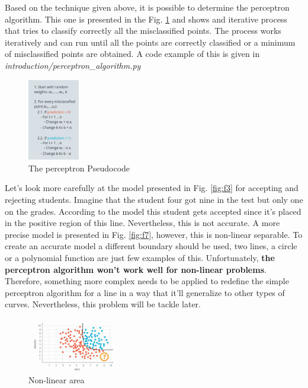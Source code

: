 \documentclass{article}
\begin{document}
Based on the technique given above, it is possible to determine the perceptron algorithm. This one is presented in the Fig. \ref{fig:f16} and shows and iterative process that tries to classify correctly all the misclassified points. The process works iteratively and can run until all the points are correctly classified or a minimum of misclassified points are obtained. A code example of this is given in \textit{introduction/perceptron\_algorithm.py}
  
\begin{figure}[ht]
    \centering
    \includegraphics[width=0.2\textwidth,height=0.2\textheight,keepaspectratio]{images/perceotron_algorithm.png}
    \captionsetup{justification=centering}
    \caption{The perceptron Pseudocode}
    \label{fig:f16}
\end{figure}
  
Let's look more carefully at the model presented in Fig. \ref{fig:f3} for accepting and rejecting students. Imagine that the student four got nine in the test but only one on the grades. According to the model this student gets accepted since it's placed in the positive region of this line. Nevertheless, this is not accurate. A more precise model is presented in Fig. \ref{fig:f7}, however, this is non-linear separable. To create an accurate model a different boundary should be used, two lines, a circle or a polynomial function are just few examples of this. Unfortunately, \textbf{the perceptron algorithm won't work well for non-linear problems}. Therefore, something more complex needs to be applied to redefine the simple perceptron algorithm for a line in a way that it'll generalize to other types of curves. Nevertheless, this problem will be tackle later.

\begin{figure}[ht]
    \centering
    \includegraphics[width=0.35\textwidth,height=0.35\textheight,keepaspectratio]{images/non_linear.png}
    \captionsetup{justification=centering}
    \caption{Non-linear area}
    \label{fig:f17}
\end{figure}
\end{document}
